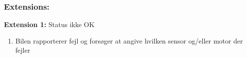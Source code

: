 \begin{framed}
	\subsubsection*{Extensions:}
	\textbf{Extension 1:} Status ikke OK	%
		\begin{enumerate}
			\item Bilen rapporterer fejl og forsøger at angive hvilken sensor og/eller motor der fejler
		\end{enumerate}
	
\end{framed}
	

%
%
%
%
%
%
%
%

